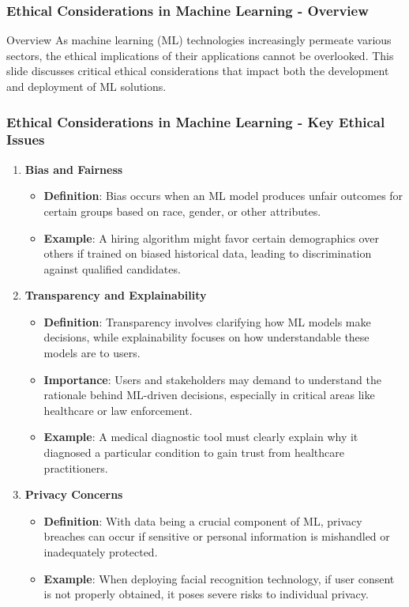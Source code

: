 \documentclass[aspectratio=169]{beamer}
\begin{document}
\begin{frame}[fragile]
    \frametitle{Ethical Considerations in Machine Learning - Overview}
    \begin{block}{Overview}
        As machine learning (ML) technologies increasingly permeate various sectors, the ethical implications of their applications cannot be overlooked. 
        This slide discusses critical ethical considerations that impact both the development and deployment of ML solutions.
    \end{block}
\end{frame}

\begin{frame}[fragile]
    \frametitle{Ethical Considerations in Machine Learning - Key Ethical Issues}
    \begin{enumerate}
        \item \textbf{Bias and Fairness}
            \begin{itemize}
                \item \textbf{Definition}: Bias occurs when an ML model produces unfair outcomes for certain groups based on race, gender, or other attributes.
                \item \textbf{Example}: A hiring algorithm might favor certain demographics over others if trained on biased historical data, leading to discrimination against qualified candidates.
            \end{itemize}
        
        \item \textbf{Transparency and Explainability}
            \begin{itemize}
                \item \textbf{Definition}: Transparency involves clarifying how ML models make decisions, while explainability focuses on how understandable these models are to users.
                \item \textbf{Importance}: Users and stakeholders may demand to understand the rationale behind ML-driven decisions, especially in critical areas like healthcare or law enforcement.
                \item \textbf{Example}: A medical diagnostic tool must clearly explain why it diagnosed a particular condition to gain trust from healthcare practitioners.
            \end{itemize}
        
        \item \textbf{Privacy Concerns}
            \begin{itemize}
                \item \textbf{Definition}: With data being a crucial component of ML, privacy breaches can occur if sensitive or personal information is mishandled or inadequately protected.
                \item \textbf{Example}: When deploying facial recognition technology, if user consent is not properly obtained, it poses severe risks to individual privacy.
            \end{itemize}
        

\end{enumerate}
\end{frame}
\end{document}
